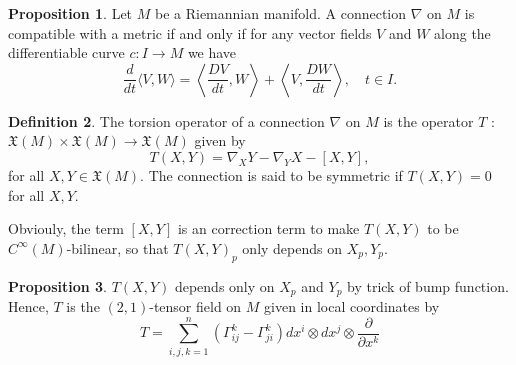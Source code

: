 \documentclass[12pt,a4paper]{book}
\theoremstyle{definition}
\newtheorem{defn}{Definition}[section]
\newtheorem{prop}[defn]{Proposition}
\begin{document}
\begin{prop}
    Let $M$ be a Riemannian manifold. A connection $\nabla$ on $M$ is compatible with a metric if and only if for any vector fields $V$ and $W$ along the differentiable curve $c: I \rightarrow M$ we have
    $$
        \frac{d}{d t}\langle V, W\rangle=\left\langle\frac{D V}{d t}, W\right\rangle+\left\langle V, \frac{D W}{d t}\right\rangle, \quad t \in I .
    $$
\end{prop}
\begin{defn}
    The torsion operator of a connection $\nabla$ on $M$ is the operator $T$ : $\mathfrak{X}(M) \times \mathfrak{X}(M) \rightarrow \mathfrak{X}(M)$ given by
    $$
        T(X, Y)=\nabla_X Y-\nabla_Y X-[X, Y],
    $$
    for all $X, Y \in \mathfrak{X}(M)$. The connection is said to be symmetric if $T(X,Y)=0$ for all $X,Y$.

    Obviouly, the term $[X, Y]$ is an correction term to make $T(X,Y)$ to be $C^{\infty}(M)$-bilinear, so that $T(X,Y)_p$ only depends on $X_p,Y_p$.
\end{defn}
\begin{prop}
    $T(X, Y)$ depends only on $X_p$ and $Y_p$ by trick of bump function. Hence, $T$ is the $(2,1)$-tensor field on $M$ given in local coordinates by
    $$
        T=\sum_{i, j, k=1}^n\left(\Gamma_{i j}^k-\Gamma_{j i}^k\right) d x^i \otimes d x^j \otimes \frac{\partial}{\partial x^k}
    $$
\end{prop}
\end{document}
